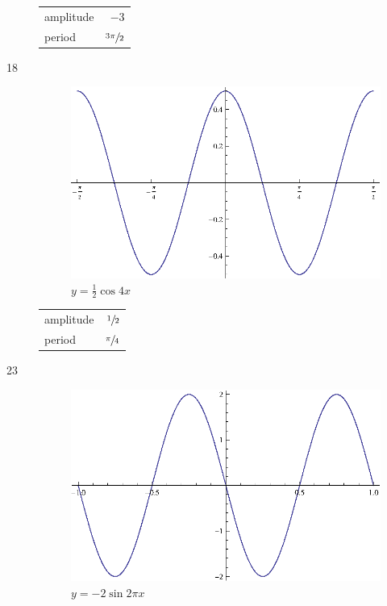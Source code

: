 \documentclass{exam}
\begin{document}
\begin{description}
        \begin{tabular}[H]{lr}
          \toprule
          amplitude & $-3$ \\
          period    & $\sfrac{3 \pi}{2}$ \\
          \bottomrule
        \end{tabular}

      \item[18]
        \begin{figure}[H]
          \centering
          \includegraphics[scale=0.9]{exercise18.eps}
          \caption{$y = \frac{1}{2} \cos 4x$}
        \end{figure}

        \begin{tabular}[H]{lr}
          \toprule
          amplitude & $\sfrac{1}{2}$ \\
          period    & $\sfrac{\pi}{4}$ \\
          \bottomrule
        \end{tabular}

      \item[23]
        \begin{figure}[H]
          \centering
          \includegraphics[scale=0.9]{exercise23.eps}
          \caption{$y = -2 \sin 2 \pi x$}
        \end{figure}


\end{description}
\end{document}
